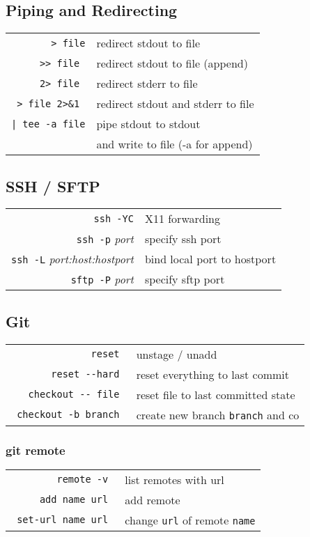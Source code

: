 \begin{multicols*}{3}
\subsection*{Piping and Redirecting}
\begin{tabular}{@{}rl@{}}
\verb|> file| & redirect stdout to file \\
\verb|>> file | & redirect stdout to file (append) \\
\verb|2> file | & redirect stderr to file \\
\verb|> file 2>&1 | & redirect stdout and stderr to file \\
\verb=| tee -a file= & pipe stdout to stdout \\ & and write to file (-a for append) \\
\end{tabular}
\subsection*{SSH / SFTP}
\begin{tabular}{@{}rl@{}}
  \verb|ssh -YC| & X11 forwarding \\
  \verb|ssh -p| \itshape{port} & specify ssh port \\
  \verb|ssh -L| \itshape{port:host:hostport} & bind local port to hostport \\
  \verb|sftp -P| \itshape{port} & specify sftp port
\end{tabular}
\subsection*{Git}
\begin{tabular}{@{}rl@{}}
  \verb| reset | & unstage / unadd \\
  \verb| reset --hard | & reset everything to last commit \\
  \verb| checkout -- file | & reset file to last committed state \\
  \verb| checkout -b branch | & create new branch \verb|branch| and co
\end{tabular}
\subsubsection*{git remote}
\begin{tabular}{@{}rl@{}}
  \verb| remote -v | & list remotes with url \\
  \verb| add name url | & add remote \\
  \verb| set-url name url | & change \verb|url| of remote \verb|name|
\end{tabular}

\end{multicols*}


